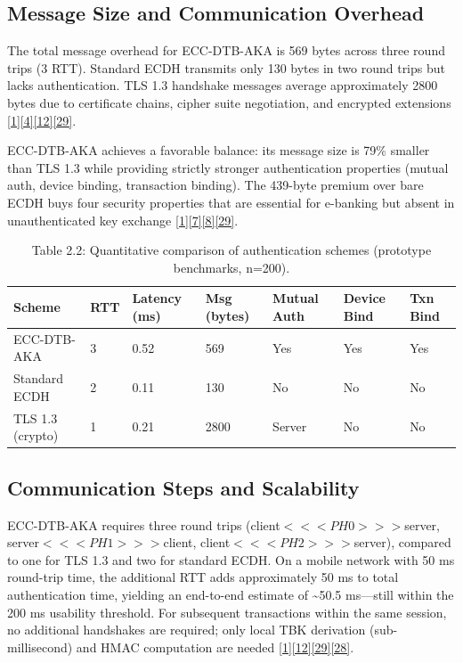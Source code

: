 \subsection{Message Size and Communication Overhead}

\indent The total message overhead for ECC-DTB-AKA is 569 bytes across three round trips (3 RTT). Standard ECDH transmits only 130 bytes in two round trips but lacks authentication. TLS 1.3 handshake messages average approximately 2800 bytes due to certificate chains, cipher suite negotiation, and encrypted extensions \hyperref[ref:1]{[1]}\hyperref[ref:4]{[4]}\hyperref[ref:12]{[12]}\hyperref[ref:29]{[29]}.

\indent ECC-DTB-AKA achieves a favorable balance: its message size is 79\% smaller than TLS 1.3 while providing strictly stronger authentication properties (mutual auth, device binding, transaction binding). The 439-byte premium over bare ECDH buys four security properties that are essential for e-banking but absent in unauthenticated key exchange \hyperref[ref:1]{[1]}\hyperref[ref:7]{[7]}\hyperref[ref:8]{[8]}\hyperref[ref:29]{[29]}.

\begin{table}[htbp]
\centering
\begin{tabular}{lllllll}
\toprule
Scheme & RTT & Latency (ms) & Msg (bytes) & Mutual Auth & Device Bind & Txn Bind \\
\midrule
ECC-DTB-AKA & 3 & 0.52 & 569 & Yes & Yes & Yes \\
Standard ECDH & 2 & 0.11 & 130 & No & No & No \\
TLS 1.3 (crypto) & 1 & 0.21 & 2800 & Server & No & No \\
\bottomrule
\end{tabular}
\caption{Table 2.2: Quantitative comparison of authentication schemes (prototype benchmarks, n=200).}\label{tbl:2.2}
\end{table}
\subsection{Communication Steps and Scalability}

\indent ECC-DTB-AKA requires three round trips (client$<<<PH0>>>$server, server$<<<PH1>>>$client, client$<<<PH2>>>$server), compared to one for TLS 1.3 and two for standard ECDH. On a mobile network with 50 ms round-trip time, the additional RTT adds approximately 50 ms to total authentication time, yielding an end-to-end estimate of \textasciitilde{}50.5 ms---still within the 200 ms usability threshold. For subsequent transactions within the same session, no additional handshakes are required; only local TBK derivation (sub-millisecond) and HMAC computation are needed \hyperref[ref:1]{[1]}\hyperref[ref:12]{[12]}\hyperref[ref:29]{[29]}\hyperref[ref:28]{[28]}.


